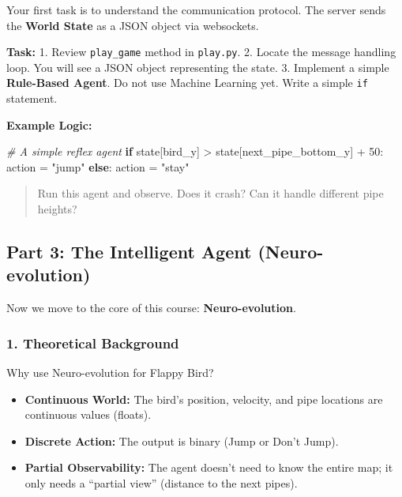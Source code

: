 \documentclass[
  12pt,
]{article}
\newenvironment{Shaded}{}{}
\newcommand{\CommentTok}[1]{\textcolor[rgb]{0.38,0.63,0.69}{\textit{#1}}}
\newcommand{\ControlFlowTok}[1]{\textcolor[rgb]{0.00,0.44,0.13}{\textbf{#1}}}
\newcommand{\DecValTok}[1]{\textcolor[rgb]{0.25,0.63,0.44}{#1}}
\newcommand{\NormalTok}[1]{#1}
\newcommand{\OperatorTok}[1]{\textcolor[rgb]{0.40,0.40,0.40}{#1}}
\newcommand{\StringTok}[1]{\textcolor[rgb]{0.25,0.44,0.63}{#1}}
\providecommand{\tightlist}{%
  \setlength{\itemsep}{0pt}\setlength{\parskip}{0pt}}
\begin{document}
Your first task is to understand the communication protocol. The server
sends the \textbf{World State} as a JSON object via websockets.

\textbf{Task:} 1. Review \texttt{play\_game} method in \texttt{play.py}.
2. Locate the message handling loop. You will see a JSON object
representing the state. 3. Implement a simple \textbf{Rule-Based Agent}.
Do not use Machine Learning yet. Write a simple \texttt{if} statement.

\textbf{Example Logic:}

\begin{Shaded}
\begin{Highlighting}[]
\CommentTok{\# A simple reflex agent}
\ControlFlowTok{if}\NormalTok{ state[}\StringTok{\textquotesingle{}bird\_y\textquotesingle{}}\NormalTok{] }\OperatorTok{\textgreater{}}\NormalTok{ state[}\StringTok{\textquotesingle{}next\_pipe\_bottom\_y\textquotesingle{}}\NormalTok{] }\OperatorTok{+} \DecValTok{50}\NormalTok{:}
\NormalTok{    action }\OperatorTok{=} \StringTok{"jump"}
\ControlFlowTok{else}\NormalTok{:}
\NormalTok{    action }\OperatorTok{=} \StringTok{"stay"}
\end{Highlighting}
\end{Shaded}

\begin{quote}
Run this agent and observe. Does it crash? Can it handle different pipe
heights?
\end{quote}

\subsection{Part 3: The Intelligent Agent
(Neuro-evolution)}\label{part-3-the-intelligent-agent-neuro-evolution}

Now we move to the core of this course: \textbf{Neuro-evolution}.

\subsubsection{1. Theoretical Background}\label{theoretical-background}

Why use Neuro-evolution for Flappy Bird?

\begin{itemize}
\tightlist
\item
  \textbf{Continuous World:} The bird's position, velocity, and pipe
  locations are continuous values (floats).
\item
  \textbf{Discrete Action:} The output is binary (Jump or Don't Jump).
\item
  \textbf{Partial Observability:} The agent doesn't need to know the
  entire map; it only needs a ``partial view'' (distance to the next
  pipes).
\end{itemize}
\end{document}
